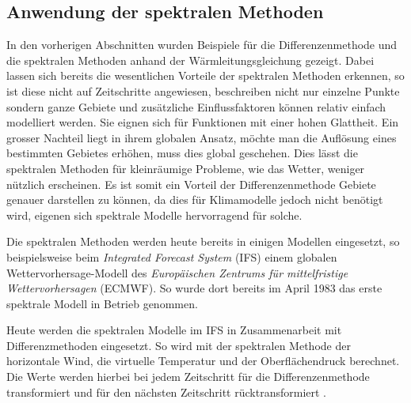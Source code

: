 \begin{refsection}
\subsection{Anwendung der spektralen Methoden}
In den vorherigen Abschnitten wurden Beispiele für die Differenzenmethode und die spektralen Methoden anhand der Wärmleitungsgleichung gezeigt. Dabei lassen sich bereits die wesentlichen Vorteile der spektralen Methoden erkennen, so ist diese nicht auf Zeitschritte angewiesen, beschreiben nicht nur einzelne Punkte sondern ganze Gebiete und zusätzliche Einflussfaktoren können relativ einfach modelliert werden. Sie eignen sich für Funktionen mit einer hohen Glattheit. Ein grosser Nachteil liegt in ihrem globalen Ansatz, möchte man die Auflösung eines bestimmten Gebietes erhöhen, muss dies global geschehen. Dies lässt die spektralen Methoden für kleinräumige Probleme, wie das Wetter, weniger nützlich erscheinen. Es ist somit ein Vorteil der Differenzenmethode Gebiete genauer darstellen zu können, da dies für Klimamodelle jedoch nicht benötigt wird, eigenen sich spektrale Modelle hervorragend für solche.
 
Die spektralen Methoden werden heute bereits in einigen Modellen eingesetzt, so beispielsweise beim {\em Integrated Forecast System} (IFS) einem globalen Wettervorhersage-Modell des {\em Europäischen Zentrums für mittelfristige Wettervorhersagen} (ECMWF). So wurde dort bereits im April 1983 das erste spektrale Modell in Betrieb genommen.

Heute werden die spektralen Modelle im IFS in Zusammenarbeit mit Differenzmethoden eingesetzt. So wird mit der spektralen Methode der horizontale Wind, die virtuelle Temperatur und der Oberflächendruck berechnet. Die Werte werden hierbei bei jedem Zeitschritt für die Differenzenmethode transformiert und für den nächsten Zeitschritt rücktransformiert \cite{klima:ecmwf}.


\printbibliography[heading=subbibliography]
\end{refsection}
